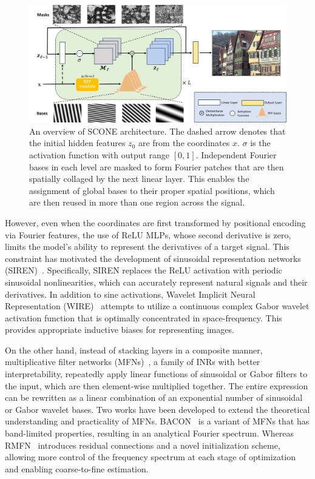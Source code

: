 \documentclass[letterpaper]{article} %
\begin{document}
\begin{figure}[th]
    \centering
    \includegraphics[width=2\columnwidth]{Figures/architecture.jpg}
    \caption{An overview of SCONE architecture. The dashed arrow denotes that the initial hidden features $z_{0}$ are from the coordinates $x$. $\sigma$ is the activation function with output range $[0, 1]$. Independent Fourier bases in each level are masked to form Fourier patches that are then spatially collaged by the next linear layer. This enables the assignment of global bases to their proper spatial positions, which are then reused in more than one region across the signal.}
    \label{fig:architecture}
\end{figure}

However, even when the coordinates are first transformed by positional encoding via Fourier features, the use of ReLU MLPs, whose second derivative is zero, limits the model's ability to represent the derivatives of a target signal. This constraint has motivated the development of sinusoidal representation networks (SIREN)~\cite{2020siren}. Specifically, SIREN replaces the ReLU activation with periodic sinusoidal nonlinearities, which can accurately represent natural signals and their derivatives. In addition to sine activations, Wavelet Implicit Neural Representation (WIRE)~\cite{saragadam2023wire} attempts to utilize a continuous complex Gabor wavelet activation function that is optimally concentrated in space-frequency. This provides appropriate inductive biases for representing images.

On the other hand, instead of stacking layers in a composite manner, multiplicative filter networks (MFNs)~\cite{fathony2020multiplicative}, a family of INRs with better interpretability, repeatedly apply linear functions of sinusoidal or Gabor filters to the input, which are then element-wise multiplied together. The entire expression can be rewritten as a linear combination of an exponential number of sinusoidal or Gabor wavelet bases. Two works have been developed to extend the theoretical understanding and practicality of MFNs. BACON~\cite{lindell2022bacon} is a variant of MFNs that has band-limited properties, resulting in an analytical Fourier spectrum. Whereas RMFN~\cite{shekarforoush2022residual} introduces residual connections and a novel initialization scheme, allowing more control of the frequency spectrum at each stage of optimization and enabling coarse-to-fine estimation.
\end{document}
